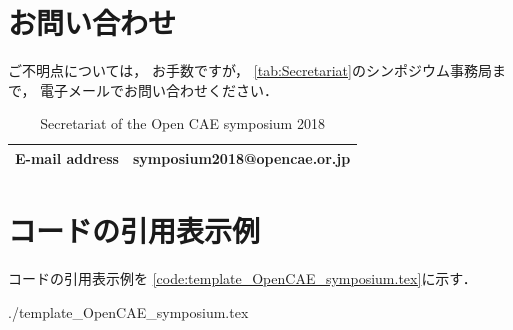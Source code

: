 \documentclass{ltjoc}
\begin{document}
\section{お問い合わせ}
ご不明点については，
お手数ですが，
\autoref{tab:Secretariat}のシンポジウム事務局まで，
電子メールでお問い合わせください．
\begin{table}[htbp]
  \centering
  \begin{tabular}{l|l}
    \hline
    E-mail address & symposium2018@opencae.or.jp\\
    \hline
    \end{tabular}
  \caption{Secretariat of the Open CAE symposium 2018}
  \label{tab:Secretariat}
\end{table}

%
%
\appendix
\section{コードの引用表示例}
%
コードの引用表示例を
\autoref{code:template_OpenCAE_symposium.tex}に示す．
%

{./template_OpenCAE_symposium.tex}
%
\end{document}
